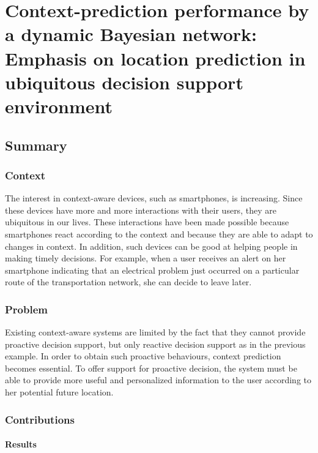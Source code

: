 \newpage
\section{Context-prediction performance by a dynamic Bayesian network: Emphasis on location prediction in ubiquitous decision support environment \cite{journals/eswa/LeeL12}} \label{lect4}

\subsection{Summary} \label{lect4-sum}

\subsubsection{Context}

The interest in context-aware devices, such as smartphones, is increasing. Since these devices have more and more interactions with their users, they are ubiquitous in our lives. These interactions have been made possible because smartphones react according to the context and because they are able to adapt to changes in context. In addition, such devices can be good at helping people in making timely decisions. For example, when a user receives an alert on her smartphone indicating that an electrical problem just occurred on a particular route of the transportation network, she can decide to leave later.

\subsubsection{Problem}

Existing context-aware systems are limited by the fact that they cannot provide proactive decision support, but only reactive decision support as in the previous example. In order to obtain such proactive behaviours, context prediction becomes essential. To offer support for proactive decision, the system must be able to provide more useful and personalized information to the user according to her potential future location.

\subsubsection{Contributions}

\paragraph{Results}

